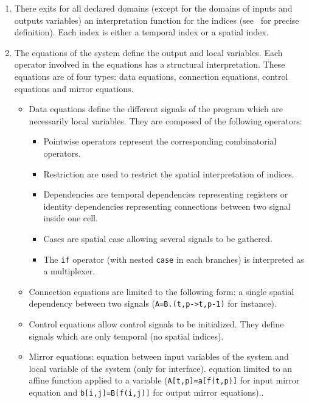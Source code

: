 \documentclass[a4paper,11pt]{article}
\begin{document}
\begin{enumerate}
\item There exits for all declared domains (except for the domains of 
inputs and outputs variables) an interpretation function for the indices
(see~\cite{dezan} for precise definition). Each index is either 
a temporal index or a spatial index.

\item The equations of the system define the output and local
variables.  Each operator involved in the equations has a structural
interpretation. These equations are of four types: data equations,
connection equations, control equations and mirror equations.
\begin{itemize} 
\item Data equations define the different signals of the program
which are necessarily local variables.
They are composed of the following operators:  
\begin{itemize} 
\item Pointwise operators represent the corresponding combinatorial 
operators. 
\item Restriction are used to restrict the spatial interpretation of 
indices.
\item Dependencies are temporal dependencies representing registers 
or identity dependencies representing connections between two signal inside one cell.
\item Cases are spatial case allowing several signals to be gathered.
\item The {\tt if} operator (with nested {\tt case} in each branches)
is interpreted as a multiplexer.
\end{itemize}
\item Connection equations are limited to the following form: a single
spatial dependency between two signals ({\tt A=B.(t,p->t,p-1)} for
instance).
\item Control equations allow control signals to be initialized. 
They define signals
which are only temporal (no spatial indices).
\item Mirror equations: equation between input variables of the system and 
local variable of the system (only for interface). equation limited to an 
affine function applied to a variable ({\tt A[t,p]=a[f(t,p)]} for input mirror
equation and {\tt b[i,j]=B[f(i,j)]} for output mirror equations)..
\end{itemize}
\end{enumerate}


\end{document}
